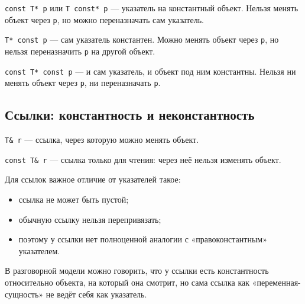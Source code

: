 \begin{definition}
\texttt{const T* p} или \texttt{T const* p} — указатель на константный объект.  
Нельзя менять объект через \texttt{p}, но можно переназначать сам указатель.
\end{definition}

\begin{definition}
\texttt{T* const p} — сам указатель константен.  
Можно менять объект через \texttt{p}, но нельзя переназначить \texttt{p} на другой объект.
\end{definition}

\begin{definition}
\texttt{const T* const p} — и сам указатель, и объект под ним константны.  
Нельзя ни менять объект через \texttt{p}, ни переназначать \texttt{p}.
\end{definition}

\subsection{Ссылки: константность и неконстантность}
\begin{definition}
\texttt{T\& r} — ссылка, через которую можно менять объект.
\end{definition}

\begin{definition}
\texttt{const T\& r} — ссылка только для чтения: через неё нельзя изменять объект.
\end{definition}

Для ссылок важное отличие от указателей такое:
\begin{itemize}
    \item ссылка не может быть пустой;
    \item обычную ссылку нельзя перепривязать;
    \item поэтому у ссылки нет полноценной аналогии с «правоконстантным» указателем.
\end{itemize}

\begin{remark}
В разговорной модели можно говорить, что у ссылки есть константность относительно объекта, на который она смотрит, но сама ссылка как «переменная-сущность» не ведёт себя как указатель.
\end{remark}


